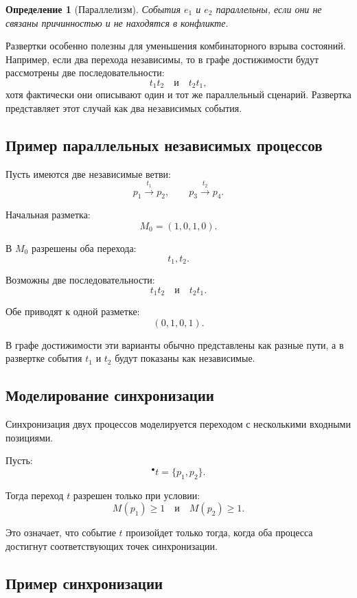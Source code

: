 \documentclass[12pt,a4paper]{article}
\newtheorem{definition}{Определение}
\begin{document}
\begin{definition}[Параллелизм]
События $e_1$ и $e_2$ параллельны, если они не связаны причинностью и не находятся в конфликте.
\end{definition}

Развертки особенно полезны для уменьшения комбинаторного взрыва состояний. Например, если два перехода независимы, то в графе достижимости будут рассмотрены две последовательности:
\[
t_1t_2
\quad \text{и} \quad
t_2t_1,
\]
хотя фактически они описывают один и тот же параллельный сценарий. Развертка представляет этот случай как два независимых события.

\subsection{Пример параллельных независимых процессов}

Пусть имеются две независимые ветви:
\[
p_1 \xrightarrow{t_1} p_2,
\qquad
p_3 \xrightarrow{t_2} p_4.
\]

Начальная разметка:
\[
M_0=(1,0,1,0).
\]

В $M_0$ разрешены оба перехода:
\[
t_1, t_2.
\]

Возможны две последовательности:
\[
t_1t_2
\quad \text{и} \quad
t_2t_1.
\]

Обе приводят к одной разметке:
\[
(0,1,0,1).
\]

В графе достижимости эти варианты обычно представлены как разные пути, а в развертке события $t_1$ и $t_2$ будут показаны как независимые.

\subsection{Моделирование синхронизации}

Синхронизация двух процессов моделируется переходом с несколькими входными позициями.

Пусть:
\[
{}^\bullet t = \{p_1,p_2\}.
\]

Тогда переход $t$ разрешен только при условии:
\[
M(p_1)\ge 1
\quad \text{и} \quad
M(p_2)\ge 1.
\]

Это означает, что событие $t$ произойдет только тогда, когда оба процесса достигнут соответствующих точек синхронизации.

\subsection{Пример синхронизации}
\end{document}

